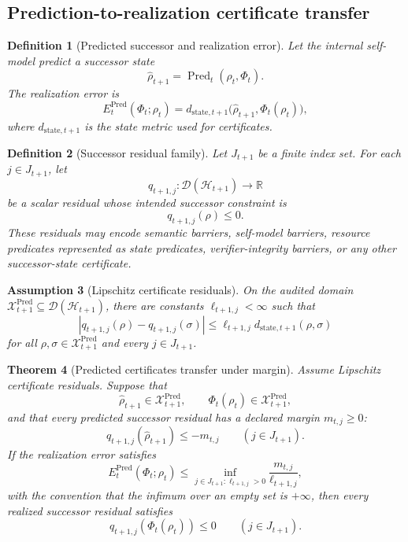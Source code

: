 \documentclass[11pt]{article}
\newtheorem{theorem}{Theorem}[section]
\newtheorem{definition}[theorem]{Definition}
\newtheorem{assumption}[theorem]{Assumption}
\newcommand{\D}{\mathcal{D}}
\newcommand{\Hcal}{\mathcal{H}}
\newcommand{\Xcal}{\mathcal{X}}
\newcommand{\1}{\mathbf{1}}
\newcommand{\state}{\mathrm{state}}
\providecommand{\Pred}{\operatorname{Pred}}
\begin{document}
\subsection{Prediction-to-realization certificate transfer}

\begin{definition}[Predicted successor and realization error]
\label{def:predicted_successor_realization_error}
Let the internal self-model predict a successor state
\[
\widehat\rho_{t+1}=\Pred_t(\rho_t,\Phi_t).
\]
The realization error is
\[
E^{\Pred}_t(\Phi_t;\rho_t)
=
d_{\state,t+1}\bigl(\widehat\rho_{t+1},\Phi_t(\rho_t)\bigr),
\]
where \(d_{\state,t+1}\) is the state metric used for certificates.
\end{definition}

\begin{definition}[Successor residual family]
\label{def:successor_residual_family_DG}
Let \(J_{t+1}\) be a finite index set.  For each \(j\in J_{t+1}\), let
\[
q_{t+1,j}:\D(\Hcal_{t+1})\to\mathbb R
\]
be a scalar residual whose intended successor constraint is
\[
q_{t+1,j}(\rho)\le0.
\]
These residuals may encode semantic barriers, self-model barriers, resource predicates represented as state predicates, verifier-integrity barriers, or any other successor-state certificate.
\end{definition}

\begin{assumption}[Lipschitz certificate residuals]
\label{ass:lipschitz_certificate_residuals}
On the audited domain \(\Xcal_{t+1}^{\Pred}\subseteq\D(\Hcal_{t+1})\), there are constants \(\ell_{t+1,j}<\infty\) such that
\[
|q_{t+1,j}(\rho)-q_{t+1,j}(\sigma)|
\le
\ell_{t+1,j}d_{\state,t+1}(\rho,\sigma)
\]
for all \(\rho,\sigma\in\Xcal_{t+1}^{\Pred}\) and every \(j\in J_{t+1}\).
\end{assumption}

\begin{theorem}[Predicted certificates transfer under margin]
\label{thm:predicted_certificate_transfer}
Assume Lipschitz certificate residuals.  Suppose that
\[
\widehat\rho_{t+1}\in\Xcal_{t+1}^{\Pred},
\qquad
\Phi_t(\rho_t)\in\Xcal_{t+1}^{\Pred},
\]
and that every predicted successor residual has a declared margin \(m_{t,j}\ge0\):
\[
q_{t+1,j}(\widehat\rho_{t+1})
\le
-m_{t,j}
\qquad (j\in J_{t+1}).
\]
If the realization error satisfies
\[
E^{\Pred}_t(\Phi_t;\rho_t)
\le
\inf_{j\in J_{t+1}:\ell_{t+1,j}>0}
\frac{m_{t,j}}{\ell_{t+1,j}},
\]
with the convention that the infimum over an empty set is \(+\infty\), then every realized successor residual satisfies
\[
q_{t+1,j}(\Phi_t(\rho_t))\le0
\qquad (j\in J_{t+1}).
\]
\end{theorem}
\end{document}

